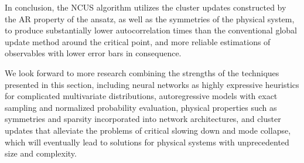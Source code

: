 In conclusion, the NCUS algorithm utilizes the cluster updates constructed by the AR property of the ansatz, as well as the symmetries of the physical system, to produce substantially lower autocorrelation times than the conventional global update method around the critical point, and more reliable estimations of observables with lower error bars in consequence.

We look forward to more research combining the strengths of the techniques presented in this section, including neural networks as highly expressive heuristics for complicated multivariate distributions, autoregressive models with exact sampling and normalized probability evaluation, physical properties such as symmetries and sparsity incorporated into network architectures, and cluster updates that alleviate the problems of critical slowing down and mode collapse, which will eventually lead to solutions for physical systems with unprecedented size and complexity.
